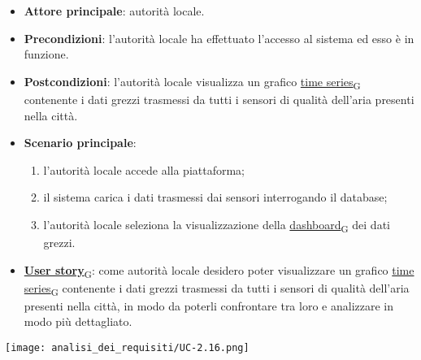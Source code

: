 \begin{itemize}
	\item \textbf{Attore principale}: autorità locale.
	\item \textbf{Precondizioni}: l'autorità locale ha effettuato l'accesso al sistema ed esso è in funzione.
	\item \textbf{Postcondizioni}: l'autorità locale visualizza un grafico \href{https://7last.github.io/docs/rtb/documentazione-interna/glossario\#time-series}{time series\textsubscript{G}} contenente i dati grezzi trasmessi da tutti i sensori
	      di qualità dell'aria presenti nella città.
	\item \textbf{Scenario principale}:
	      \begin{enumerate}
		      \item l'autorità locale accede alla piattaforma;
		      \item il sistema carica i dati trasmessi dai sensori interrogando il database;
		      \item l'autorità locale seleziona la visualizzazione della \href{https://7last.github.io/docs/rtb/documentazione-interna/glossario\#dashboard}{dashboard\textsubscript{G}} dei dati grezzi.
	      \end{enumerate}
	\item \href{https://7last.github.io/docs/rtb/documentazione-interna/glossario\#user-story}{\textbf{User story}\textsubscript{G}}:
	      come autorità locale desidero poter visualizzare un grafico \href{https://7last.github.io/docs/rtb/documentazione-interna/glossario\#time-series}{time series\textsubscript{G}} contenente i dati grezzi trasmessi da tutti i sensori
	      di qualità dell'aria presenti nella città, in modo da poterli confrontare tra loro e analizzare in modo più dettagliato.
\end{itemize}
\begin{center}
	\texttt{[image: analisi\_dei\_requisiti/UC-2.16.png]}
\end{center}

\newpage

